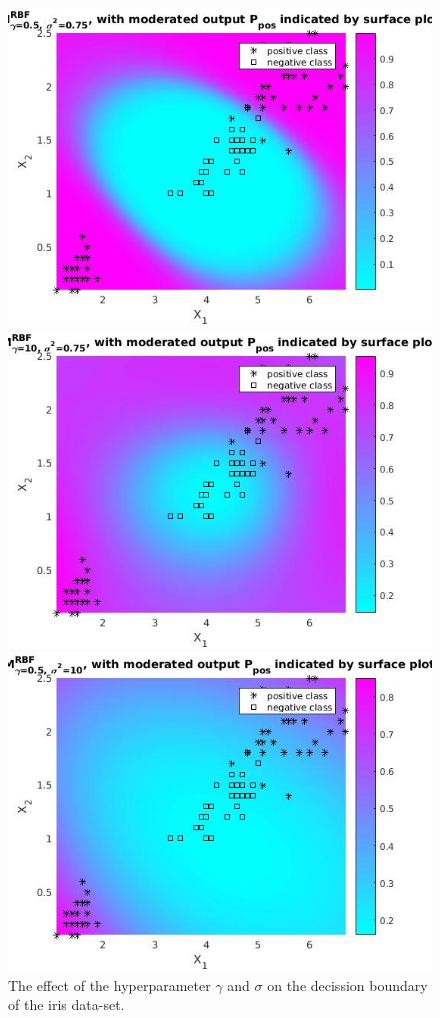 \documentclass[•]{article}
\begin{document}
\begin{figure}[H]
\centering
\begin{minipage}{.3\textwidth}
\includegraphics[width=.8\textwidth]{irisclassprob.jpg}
\end{minipage}
\begin{minipage}{.3\textwidth}
\includegraphics[width=.8\textwidth]{gammablur.jpg}
\end{minipage}
\begin{minipage}{.3\textwidth}
\includegraphics[width=.8\textwidth]{sigmablur.jpg}
\end{minipage}
\caption{The effect of the hyperparameter $\gamma$ and $\sigma$ on the decission boundary of the iris data-set.}
\end{figure}
\end{document}
